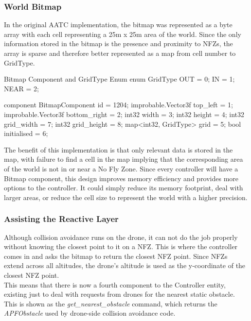 \documentclass[a4paper,12pt,titlepage]{article}
\begin{document}
\subsubsection{World Bitmap}
In the original AATC implementation, the bitmap was represented as a byte array with each cell representing a 25m x 25m area of the world. Since the only information stored in the bitmap is the presence and proximity to NFZs, the array is sparse and therefore better represented as a map from cell number to GridType.\\

\begin{sexylisting}[colback=white]{Bitmap Component and GridType Enum}
enum GridType {
  OUT = 0;
  IN = 1;
  NEAR = 2;
}

component BitmapComponent {
  id = 1204;
  improbable.Vector3f top_left = 1;
  improbable.Vector3f bottom_right = 2;
  int32 width = 3;
  int32 height = 4;
  int32 grid_width = 7;
  int32 grid_height = 8;
  map<int32, GridType> grid = 5;
  bool initialised = 6;
}
\end{sexylisting}

The benefit of this implementation is that only relevant data is stored in the map, with failure to find a cell in the map implying that the corresponding area of the world is not in or near a No Fly Zone. Since every controller will have a Bitmap component, this design improves memory efficiency and provides more options to the controller. It could simply reduce its memory footprint, deal with larger areas, or reduce the cell size to represent the world with a higher precision.

\subsubsection{Assisting the Reactive Layer}
Although collision avoidance runs on the drone, it can not do the job properly without knowing the closest point to it on a NFZ. This is where the controller comes in and asks the bitmap to return the closest NFZ point. Since NFZs extend across all altitudes, the drone's altitude is used as the y-coordinate of the closest NFZ point.\\

This means that there is now a fourth component to the Controller entity, existing just to deal with requests from drones for the nearest static obstacle. This is shown as the \textit{get\_nearest\_obstacle} command, which returns the \textit{APFObstacle} used by drone-side collision avoidance code.\\
\end{document}
